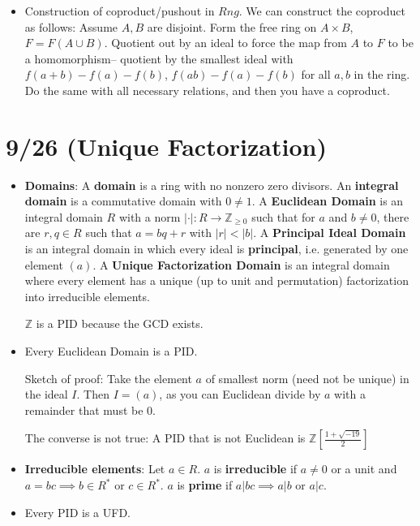 \documentclass[11pt, oneside]{amsart}   	%
\theoremstyle{definition}
\begin{document}
\begin{itemize}
	\item Construction of coproduct/pushout in $Rng$. We can construct the coproduct as follows: Assume $A, B$ are disjoint. Form the free ring on 
	$A\times B$, $F = F(A\cup B)$. Quotient out by an ideal to force the map from $A$ to $F$ to be a homomorphism-- quotient by the smallest ideal 
	with $f(a + b) - f(a) - f(b)$, $f(ab) - f(a) - f(b)$ for all $a, b$ in the ring. Do the same with all necessary relations, and then you have a coproduct.

\end{itemize}

\section{9/26 (Unique Factorization)}

\begin{itemize}

	\item \textbf{Domains}: A \textbf{domain} is a ring with no nonzero zero divisors. An \textbf{integral domain} is a commutative domain with $0\neq 
	1$. A \textbf{Euclidean Domain} is an integral domain $R$ with a norm $|\cdot| : R\rightarrow\mathbb Z_{\geq 0}$ such that for $a$ and $b\neq 
	0$, there are $r, q\in R$ such that $a = bq + r$ with $|r| < |b|$. A \textbf{Principal Ideal Domain} is an integral domain in which every ideal is 
	\textbf{principal}, i.e. generated by one element $(a)$. A \textbf{Unique Factorization Domain} is an integral domain where every element has a 
	unique (up to unit and permutation) factorization into irreducible elements.
	
	$\mathbb Z$ is a PID because the GCD exists. 
	
	\item Every Euclidean Domain is a PID.
	
	Sketch of proof: Take the element $a$ of smallest norm (need not be unique) in the ideal $I$. Then $I = (a)$, as you can Euclidean divide by $a$ 
	with a remainder that must be $0$.
	
	The converse is not true: A PID that is not Euclidean is $\mathbb Z[\frac{1 + \sqrt{-19}}{2}]$
	
	\item \textbf{Irreducible elements}: Let $a\in R$. $a$ is \textbf{irreducible} if $a\neq 0$ or a unit and $a = bc\implies b\in R^*$ or $c\in R^*$. $a$ is 
	\textbf{prime} if $a|bc\implies a|b$ or $a|c$. 
	
	\item Every PID is a UFD. 
	

\end{itemize}
\end{document}
